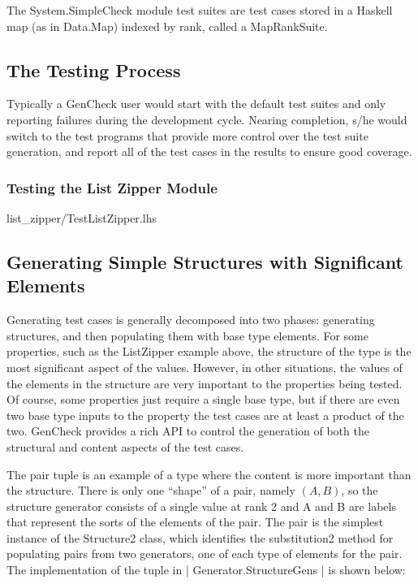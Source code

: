 The System.SimpleCheck module test suites are test cases stored in 
a Haskell map (as in Data.Map) indexed by rank, called a MapRankSuite.


\subsection{The Testing Process}
Typically a GenCheck user would start with the default test suites
and only reporting failures during the development cycle.
Nearing completion, s/he would switch to the test programs 
that provide more control over the test suite generation,
and report all of the test cases in the results to ensure good coverage.


\subsubsection{Testing the List Zipper Module}
 {list_zipper/TestListZipper.lhs}

\subsection{Generating Simple Structures with Significant Elements}

Generating test cases is generally decomposed into two phases: 
generating structures, and then populating them with base type elements.
For some properties, such as the ListZipper example above,
the structure of the type is the most significant aspect of the values.
However, in other situations, the values of the elements in the structure
are very important to the properties being tested.
Of course, some properties just require a single base type, 
but if there are even two base type inputs to the property
the test cases are at least a product of the two.
GenCheck provides a rich API to control the generation of both 
the structural and content aspects of the test cases.

The pair tuple is an example of a type where the content is more important
than the structure.  There is only one ``shape'' of a pair, namely $(A, B)$,
so the structure generator consists of a single value at rank 2 and
A and B are labels that represent the sorts of the elements of the pair.
The pair is the simplest instance of the Structure2 class, 
which identifies the substitution2 method for populating pairs from two generators,
one of each type of elements for the pair.  The implementation of the tuple
in | Generator.StructureGens | is shown below:

